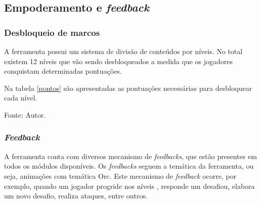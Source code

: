  \subsection{Empoderamento e \textit{feedback}}
	 \subsubsection{Desbloqueio de marcos}
	A ferramenta possui um sistema de divisão de conteúdos por níveis. No total existem 12 níveis que vão sendo desbloqueados a medida que os jogadores conquistam determinadas pontuações.

	Na tabela \ref{pontos} são apresentadas as pontuações necessárias para desbloquear cada nível.


\begin{table}[h]
	\centering
	\caption{Pontuações.}
	\label{pontos}
	Fonte: Autor.
\end{table}

\subsubsection{\textit{Feedback}}

A ferramenta conta com diversos mecanismo de \textit{feedbacks}, que estão presentes em todos os módulos disponíveis.
Os \textit{feedbacks} seguem a temática da ferramenta, ou seja, animações com temática Orc. Este mecanismo de \textit{feedback} ocorre, por exemplo, quando um jogador progride nos níveis
, responde um desafiou, elabora um novo desafio, realiza ataques, entre outros.

